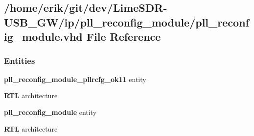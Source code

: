 \subsection{/home/erik/git/dev/\+Lime\+S\+D\+R-\/\+U\+S\+B\+\_\+\+G\+W/ip/pll\+\_\+reconfig\+\_\+module/pll\+\_\+reconfig\+\_\+module.vhd File Reference}
\label{pll__reconfig__module_8vhd}
\subsubsection*{Entities}
\begin{DoxyCompactItemize}
\item 
{\bf pll\+\_\+reconfig\+\_\+module\+\_\+pllrcfg\+\_\+ok11} entity
\item 
{\bf R\+TL} architecture
\item 
{\bf pll\+\_\+reconfig\+\_\+module} entity
\item 
{\bf R\+TL} architecture
\end{DoxyCompactItemize}
